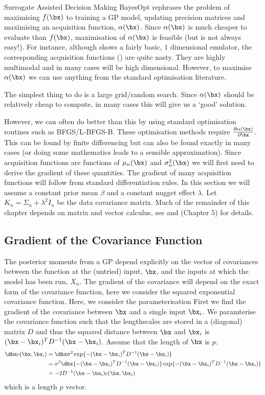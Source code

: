 \begin{chapter}{Surrogate Assisted Decision Making \label{Chap:optimisation}}
BayesOpt rephrases the problem of maximising $f(\bx)$ to training a GP model, updating precision matrices and maximising an acquisition function, $\alpha(\bx)$. Since $\alpha(\bx)$ is much cheaper to evaluate than $f(\bx)$, maximisation of $\alpha(\bx)$ is feasible (but is not always easy!). For instance, although  shows a fairly basic, $1$ dimensional emulator, the corresponding acquisition functions () are quite nasty. They are highly multimodal and in many cases will be high dimensional. However, to maximise $\alpha(\bx)$ we can use anything from the standard optimisation literature.

The simplest thing to do is a large grid/random search. Since $\alpha(\bx)$ should be relatively cheap to compute, in many cases this will give us a `good' solution.

However, we can often do better than this by using standard optimisation routines such as BFGS/L-BFGS-B. These optimisation methods require $\frac{\partial \alpha(\bx)}{\partial \bx}$. This can be found by finite differencing but can also be found exactly in many cases (or doing some mathematics leads to a sensible approximation). Since acquisition functions are functions of $\mu_n(\bx)$ and $\sigma^2_n(\bx)$ we will first need to derive the gradient of these quantities. The gradient of many acquisition functions will follow from standard differentiation rules. In this section we will assume a constant prior mean $\beta$ and a constant nugget effect $\lambda$. Let $K_n = \Sigma_n + \lambda^2 I_n$ be the data covariance matrix. Much of the remainder of this chapter depends on matrix and vector calculus, see \citet{Wand2002} and \citet{Deisenroth2020} (Chapter $5$) for details.


\subsection{Gradient of the Covariance Function}

The posterior moments from a GP depend explicitly on the vector of covariances between the function at the (untried) input, $\bx$, and the inputs at which the model has been run, $X_n$. The gradient of the covariance will depend on the exact form of the covariance function, here we consider the squared exponential covariance function.
Here, we consider the parameterisation
First we find the gradient of the covariance between $\bx$ and a single input $\bx_i$. We paramterise the covariance function such that the lengthscales are stored in a (diagonal) matrix $D$ and thus the squared distance between $\bx$ and $\bx_i$ is $(\bx - \bx_i)^T D^{-1} (\bx - \bx_i)$. Assume that the length of $\bx$ is $p$.
\begin{align}
  \dbx	c(\bx, \bx_i) &= \dbx \sigma^2 \exp\{ -(\bx - \bx_i)^T D^{-1} (\bx - \bx_i) \}\\\nonumber
  &=\sigma^2 \dbx \{ -(\bx - \bx_i)^T D^{-1} (\bx - \bx_i) \} \exp\{ -(\bx - \bx_i)^T D^{-1} (\bx - \bx_i) \}\\\nonumber
  &= -2 D^{-1} (\bx - \bx_i) c(\bx, \bx_i)
\end{align}
 which is a length $p$ vector.



\end{chapter}
